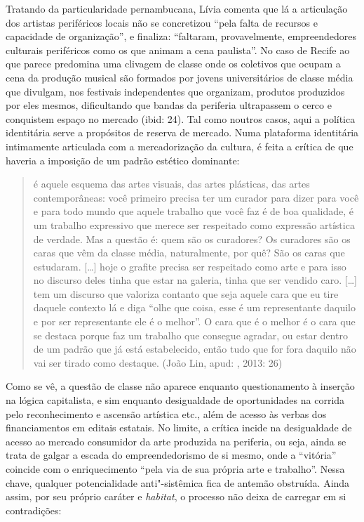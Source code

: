 Tratando da particularidade pernambucana, Lívia comenta que lá a
articulação dos artistas periféricos locais não se concretizou ``pela
falta de recursos e capacidade de organização'', e finaliza: ``faltaram,
provavelmente, empreendedores culturais periféricos como os que animam a
cena paulista''. No caso de Recife ao que parece predomina uma clivagem
de classe onde os coletivos que ocupam a cena da produção musical são
formados por jovens universitários de classe média que divulgam, nos
festivais independentes que organizam, produtos produzidos por eles
mesmos, dificultando que bandas da periferia ultrapassem o cerco e
conquistem espaço no mercado (ibid: 24). Tal como noutros casos, aqui a
política identitária serve a propósitos de reserva de mercado. Numa
plataforma identitária intimamente articulada com a mercadorização da
cultura, é feita a crítica de que haveria a imposição de um padrão
estético dominante:

\begin{quote}
é aquele esquema das artes visuais, das artes plásticas, das artes
contemporâneas: você primeiro precisa ter um curador para dizer para
você e para todo mundo que aquele trabalho que você faz é de boa
qualidade, é um trabalho expressivo que merece ser respeitado como
expressão artística de verdade. Mas a questão é: quem são os curadores?
Os curadores são os caras que vêm da classe média, naturalmente, por
quê? São os caras que estudaram. {[}\ldots{}{]} hoje o grafite precisa ser
respeitado como arte e para isso no discurso deles tinha que estar na
galeria, tinha que ser vendido caro. {[}\ldots{}{]} tem um discurso que
valoriza contanto que seja aquele cara que eu tire daquele contexto lá e
diga ``olhe que coisa, esse é um representante daquilo e por ser
representante ele é o melhor''. O cara que é o melhor é o cara que se
destaca porque faz um trabalho que consegue agradar, ou estar dentro de
um padrão que já está estabelecido, então tudo que for fora daquilo não
vai ser tirado como destaque. (João Lin, apud: , 2013: 26)
\end{quote}

Como se vê, a questão de classe não aparece enquanto questionamento à
inserção na lógica capitalista, e sim enquanto desigualdade de
oportunidades na corrida pelo reconhecimento e ascensão artística etc.,
além de acesso às verbas dos financiamentos em editais estatais. No
limite, a crítica incide na desigualdade de acesso ao mercado consumidor
da arte produzida na periferia, ou seja, ainda se trata de galgar a
escada do empreendedorismo de si mesmo, onde a ``vitória'' coincide com
o enriquecimento ``pela via de sua própria arte e trabalho''. Nessa
chave, qualquer potencialidade anti"-sistêmica fica de antemão obstruída.
Ainda assim, por seu próprio caráter e \emph{habitat}, o processo não
deixa de carregar em si contradições:

